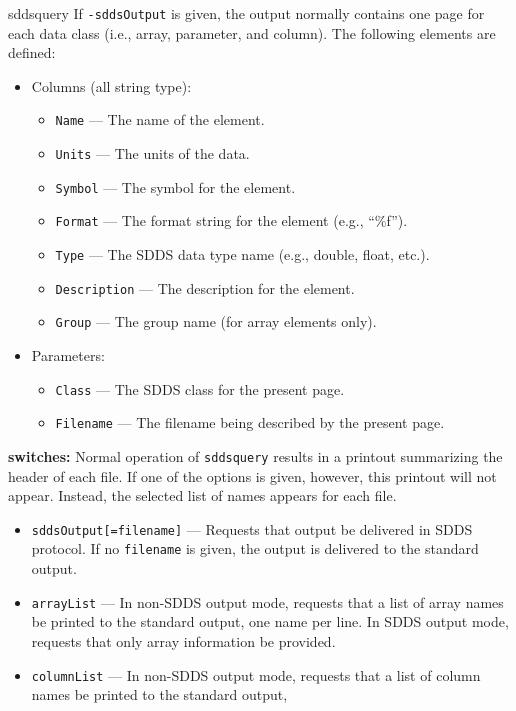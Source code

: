 \begin{sddsprog}{sddsquery}
    If \verb|-sddsOutput| is given, the output normally contains one page for each data class (i.e., array, parameter, and
    column). The following elements are defined:
    \begin{itemize}
      \item Columns (all string type):
        \begin{itemize}
          \item \verb|Name| --- The name of the element.
          \item \verb|Units| --- The units of the data.
          \item \verb|Symbol| --- The symbol for the element.
          \item \verb|Format| --- The format string for the element (e.g., ``\%f'').
          \item \verb|Type| --- The SDDS data type name (e.g., double, float, etc.).
          \item \verb|Description| --- The description for the element.
          \item \verb|Group| --- The group name (for array elements only).
        \end{itemize}
      \item Parameters:
        \begin{itemize}
          \item \verb|Class| --- The SDDS class for the present page.
          \item \verb|Filename| --- The filename being described by the present page.
        \end{itemize}
    \end{itemize}
  \item \textbf{switches:} Normal operation of \verb|sddsquery| results in a printout summarizing the header of each file. If one of
    the options is given, however, this printout will not appear. Instead, the selected list of names appears for each file.
    \begin{itemize}
      \item \verb|sddsOutput[=filename]| --- Requests that output be delivered in SDDS protocol. If no \verb|filename| is given,
        the output is delivered to the standard output.
      \item \verb|arrayList| --- In non-SDDS output mode, requests that a list of array names be printed to the standard output, one
        name per line. In SDDS output mode, requests that only array information be provided.
      \item \verb|columnList| --- In non-SDDS output mode, requests that a list of column names be printed to the standard output,

\end{itemize}
\end{sddsprog}
